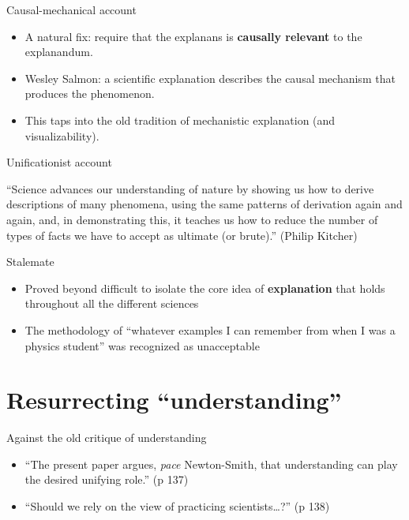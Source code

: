 \documentclass[fleqn]{beamer}
\begin{document}
\begin{frame}{Causal-mechanical account}

  \begin{itemize}
  \item A natural fix: require that the explanans is \textbf{causally
    relevant} to the explanandum.
  \item Wesley Salmon: a scientific explanation describes the causal
    mechanism that produces the phenomenon.
  \item This taps into the old tradition of mechanistic explanation
    (and visualizability).
  \end{itemize}

\end{frame}

\begin{frame}{Unificationist account}

  ``Science advances our understanding of nature by showing us how to
  derive descriptions of many phenomena, using the same patterns of
  derivation again and again, and, in demonstrating this, it teaches
  us how to reduce the number of types of facts we have to accept as
  ultimate (or brute).'' (Philip Kitcher)

\end{frame}

\begin{frame}{Stalemate}

  \begin{itemize}
  \item Proved beyond difficult to isolate the core idea of
    \textbf{explanation} that holds throughout all the different
    sciences
  \item The methodology of ``whatever examples I can remember from
    when I was a physics student'' was recognized as unacceptable
  \end{itemize}

\end{frame}

\section{Resurrecting ``understanding''}

\begin{frame}{Against the old critique of understanding}

  \begin{itemize}
  \item ``The present paper argues, \emph{pace} Newton-Smith, that
    understanding can play the desired unifying role.'' (p 137)
  \item ``Should we rely on the view of practicing scientists\dots?'' (p 138)
  \end{itemize}

\end{frame}
\end{document}
